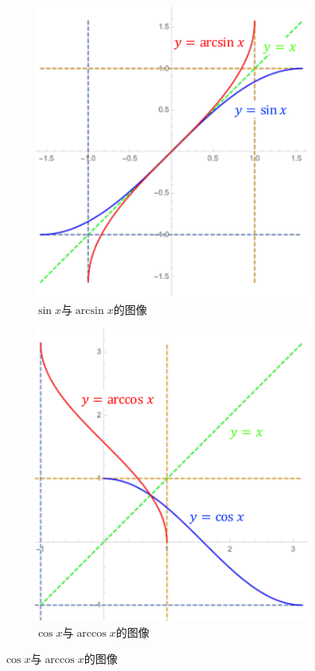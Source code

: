 \begin{figure}[h]
	\centering
	\begin{subfigure}[t]{0.45\textwidth}
		\centering
		\includegraphics[width=\textwidth]
		{./Images/Ch01/sin-Arcsin.pdf}	
		\caption{$\sin x$与$\arcsin x$的图像}
	\end{subfigure}
	\begin{subfigure}[t]{0.45\textwidth}
		\centering
		\includegraphics[width=\textwidth]
		{./Images/Ch01/cos-Arccos.pdf}	
		\caption{$\cos x$与$\arccos x$的图像}
	\end{subfigure}


\end{figure}
